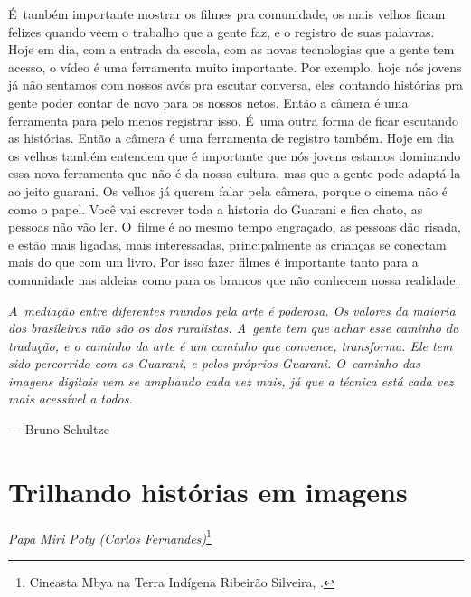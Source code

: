 É~também importante mostrar os filmes pra comunidade, os mais velhos
ficam felizes quando veem o trabalho que a gente faz, e o registro de
suas palavras. Hoje em dia, com a entrada da escola, com as novas
tecnologias que a gente tem acesso, o vídeo é uma ferramenta muito
importante. Por exemplo, hoje nós jovens já não sentamos com nossos
avós pra escutar conversa, eles contando histórias pra gente poder
contar de novo para os nossos netos. Então a câmera é uma ferramenta
para pelo menos registrar isso. É~uma outra forma de ficar escutando as
histórias. Então a câmera é uma ferramenta de registro também. Hoje em
dia os velhos também entendem que é importante que nós jovens estamos
dominando essa nova ferramenta que não é da nossa cultura, mas que a
gente pode adaptá-la ao jeito guarani. Os velhos já querem falar pela
câmera, porque o cinema não é como o papel. Você vai escrever toda a
historia do Guarani e fica chato, as pessoas não vão ler. O~filme é ao
mesmo tempo engraçado, as pessoas dão risada, e estão mais ligadas,
mais interessadas, principalmente as crianças se conectam mais do que
com um livro. Por isso fazer filmes é importante tanto para a
comunidade nas aldeias como para os brancos que não conhecem nossa
realidade.

\clearpage

\vspace*{\fill}

\begin{flushleft}
\begin{minipage}[c]{0.85\textwidth}
\raggedright
\footnotesize
\emph{A~mediação entre diferentes mundos pela arte é poderosa. Os valores da
maioria dos brasileiros não são os dos ruralistas. A~gente tem que
achar esse caminho da tradução, e o caminho da arte é um caminho que
convence, transforma. Ele tem sido percorrido com os Guarani, e pelos
próprios Guarani. O~caminho das imagens digitais vem se ampliando cada
vez mais, já que a técnica está cada vez mais acessível a todos.}

\smallskip
\hspace*{\fill}--- Bruno Schultze
\end{minipage}
\end{flushleft}

\chapter{Trilhando histórias em imagens}
\begin{flushright}
\emph{Papa Miri Poty (Carlos Fernandes)}\footnote{Cineasta Mbya
na Terra Indígena Ribeirão Silveira, .}
\end{flushright}
\medskip

